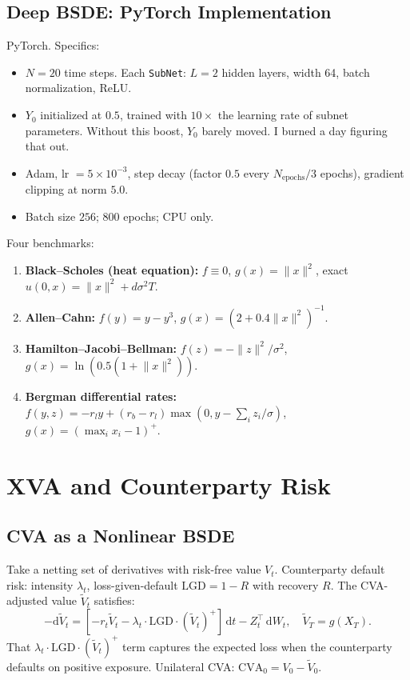 \documentclass[11pt]{article}
\theoremstyle{definition}
\theoremstyle{remark}
\newcommand{\dt}{\,\mathrm{d}t}
\newcommand{\dW}{\,\mathrm{d}W}
\newcommand{\norm}[1]{\lVert #1 \rVert}
\begin{document}
\subsection{Deep BSDE: PyTorch Implementation}

PyTorch. Specifics:
\begin{itemize}
  \item $N = 20$ time steps. Each \texttt{SubNet}: $L = 2$ hidden
  layers, width 64, batch normalization, ReLU.
  \item $Y_0$ initialized at $0.5$, trained with $10\times$ the
  learning rate of subnet parameters. Without this boost,
  $Y_0$ barely moved. I burned a day figuring that out.
  \item Adam, lr $= 5 \times 10^{-3}$, step decay (factor $0.5$
  every $N_{\text{epochs}}/3$ epochs), gradient clipping at norm $5.0$.
  \item Batch size $256$; $800$ epochs; CPU only.
\end{itemize}

Four benchmarks:
\begin{enumerate}
  \item \textbf{Black--Scholes (heat equation):} $f \equiv 0$,
  $g(x) = \norm{x}^2$, exact $u(0,x) = \norm{x}^2 + d\sigma^2 T$.
  \item \textbf{Allen--Cahn:} $f(y) = y - y^3$,
  $g(x) = (2 + 0.4\norm{x}^2)^{-1}$.
  \item \textbf{Hamilton--Jacobi--Bellman:}
  $f(z) = -\norm{z}^2/\sigma^2$,
  $g(x) = \ln(0.5(1 + \norm{x}^2))$.
  \item \textbf{Bergman differential rates:}
  $f(y,z) = -r_l y + (r_b - r_l)\max(0, y - \sum_i z_i / \sigma)$,
  $g(x) = (\max_i x_i - 1)^+$.
\end{enumerate}


\section{XVA and Counterparty Risk}\label{sec:xva}

\subsection{CVA as a Nonlinear BSDE}

Take a netting set of derivatives with risk-free value $V_t$.
Counterparty default risk: intensity $\lambda_t$, loss-given-default
$\text{LGD} = 1 - R$ with recovery $R$.
The CVA-adjusted value $\tilde{V}_t$ satisfies:
\begin{equation}\label{eq:cva_bsde}
  -\mathrm{d}\tilde{V}_t = \left[-r_t \tilde{V}_t
  - \lambda_t \cdot \text{LGD} \cdot (\tilde{V}_t)^+\right]\dt
  - Z_t^\top \dW_t,
  \quad \tilde{V}_T = g(X_T).
\end{equation}
That $\lambda_t \cdot \text{LGD} \cdot (\tilde{V}_t)^+$ term
captures the expected loss when the counterparty defaults on
positive exposure. Unilateral CVA: $\text{CVA}_0 = V_0 - \tilde{V}_0$.
\end{document}
